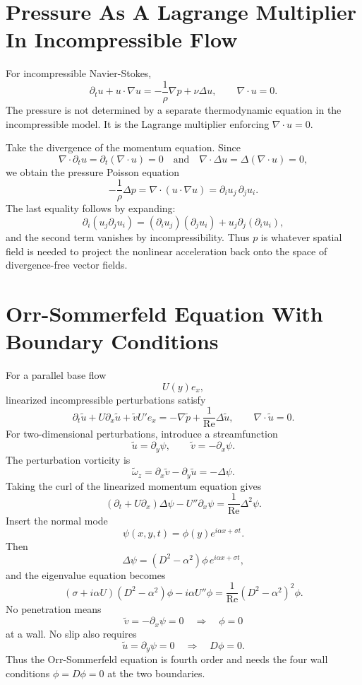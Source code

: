 \section{Pressure As A Lagrange Multiplier In Incompressible Flow}
\label{sec:detailed-pressure-multiplier}

For incompressible Navier-Stokes,
\[
  \partial_tu+u\cdot\nabla u
  =
  -\frac1\rho\nabla p+\nu\Delta u,
  \qquad
  \nabla\cdot u=0.
\]
The pressure is not determined by a separate thermodynamic equation in the
incompressible model. It is the Lagrange multiplier enforcing
\(\nabla\cdot u=0\).

Take the divergence of the momentum equation. Since
\[
  \nabla\cdot\partial_tu=\partial_t(\nabla\cdot u)=0
  \quad\text{and}\quad
  \nabla\cdot\Delta u=\Delta(\nabla\cdot u)=0,
\]
we obtain the pressure Poisson equation
\[
  \boxed{
  -\frac1\rho\Delta p
  =
  \nabla\cdot(u\cdot\nabla u)
  =
  \partial_i u_j\,\partial_j u_i.
  }
\]
The last equality follows by expanding:
\[
  \partial_i(u_j\partial_j u_i)
  =
  (\partial_i u_j)(\partial_j u_i)
  +
  u_j\partial_j(\partial_i u_i),
\]
and the second term vanishes by incompressibility. Thus \(p\) is whatever
spatial field is needed to project the nonlinear acceleration back onto the
space of divergence-free vector fields.

\section{Orr-Sommerfeld Equation With Boundary Conditions}
\label{sec:detailed-orr-sommerfeld}

For a parallel base flow
\[
  U(y)e_x,
\]
linearized incompressible perturbations satisfy
\[
  \partial_t\tilde u
  +
  U\partial_x\tilde u
  +
  \tilde v U'e_x
  =
  -\nabla\tilde p+\frac1{\mathrm{Re}}\Delta\tilde u,
  \qquad
  \nabla\cdot\tilde u=0.
\]
For two-dimensional perturbations, introduce a streamfunction
\[
  \tilde u=\partial_y\psi,
  \qquad
  \tilde v=-\partial_x\psi.
\]
The perturbation vorticity is
\[
  \tilde\omega_z
  =
  \partial_x\tilde v-\partial_y\tilde u
  =
  -\Delta\psi.
\]
Taking the curl of the linearized momentum equation gives
\[
  \left(\partial_t+U\partial_x\right)\Delta\psi
  -
  U''\partial_x\psi
  =
  \frac1{\mathrm{Re}}\Delta^2\psi.
\]
Insert the normal mode
\[
  \psi(x,y,t)=\phi(y)e^{i\alpha x+\sigma t}.
\]
Then
\[
  \Delta\psi=(D^2-\alpha^2)\phi\,e^{i\alpha x+\sigma t},
\]
and the eigenvalue equation becomes
\[
  \boxed{
  (\sigma+i\alpha U)(D^2-\alpha^2)\phi
  -
  i\alpha U''\phi
  =
  \frac1{\mathrm{Re}}(D^2-\alpha^2)^2\phi.
  }
\]
No penetration means
\[
  \tilde v=-\partial_x\psi=0
  \quad\Rightarrow\quad
  \phi=0
\]
at a wall. No slip also requires
\[
  \tilde u=\partial_y\psi=0
  \quad\Rightarrow\quad
  D\phi=0.
\]
Thus the Orr-Sommerfeld equation is fourth order and needs the four wall
conditions \(\phi=D\phi=0\) at the two boundaries.

